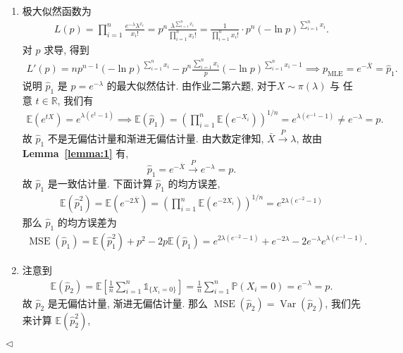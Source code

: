 \documentclass[11pt]{article}
\newenvironment{answer}[1][Solution]{\begin{trivlist}
    \item[\hskip \labelsep {\bfseries #1.}\hskip \labelsep]}{\hfill$\lhd$\end{trivlist}}
\newcommand\1{\mathds{1}}
\newcommand\R{\mathbb{R}}
\newcommand\E{\mathbb{E}}
\newcommand\PP{\mathbb{P}}
\newcommand{\arrp}{\xrightarrow{P}}
\DeclareMathOperator{\Var}{Var}
\DeclareMathOperator{\MSE}{MSE}
\begin{document}
\begin{answer}
    \begin{enumerate}[label=(\arabic*)]
        \item 极大似然函数为
        \begin{align*}
            L(p) = \prod_{i=1}^{n} \frac{e^{-\lambda}\lambda^{x_i}}{x_i!} = p^n \frac{\lambda^{\sum_{i=1}^{n}x_i}}{\prod_{i=1}^{n}x_i!} = \frac{1}{\prod_{i=1}^{n}x_i !}\cdot p^n (-\ln p)^{\sum_{i=1}^{n}x_i}.
        \end{align*}
        对 $p$ 求导, 得到
        \begin{align*}
            L'(p) = n p^{n-1}(-\ln p)^{\sum_{i=1}^{n}x_i} - p^n \frac{\sum_{i=1}^{n}x_i}{p}(-\ln p)^{\sum_{i=1}^{n}x_i - 1} \implies p_{\mathrm{MLE}} = e^{-\bar{X}} = \hat{p}_1.
        \end{align*}
        说明 $\hat{p}_1$ 是 $p = e^{-\lambda}$ 的最大似然估计. 由作业二第六题, 对于$X\sim \pi(\lambda)$ 与 任意 $t\in \R$, 我们有
        \begin{align*}
            \E\left(e^{tX}\right) = e^{\lambda(e^t - 1)} \implies \E\left(\hat{p}_1\right) =  \left(\prod_{i=1}^{n}\E\left(e^{-X_i}\right)\right)^{1/n} = e^{\lambda(e^{-1} - 1)} \neq e^{-\lambda} = p.
        \end{align*}
        故 $\hat{p}_1$ 不是无偏估计量和渐进无偏估计量. 由大数定律知, $\bar{X} \arrp \lambda$, 故由\textbf{Lemma~\ref{lemma:1}} 有, 
        \[
        \hat{p}_1 = e^{-\bar{X}} \arrp e^{-\lambda} = p.
        \] 
        故 $\hat{p}_1$ 是一致估计量. 下面计算 $\hat{p}_1$ 的均方误差,
        \begin{align*}
            \E\left(\hat{p}_1^2\right) = \E\left(e^{-2\bar{X}}\right) =  \left(\prod_{i=1}^{n}\E\left(e^{-2X_i}\right)\right)^{1/n} = e^{2\lambda(e^{-2} - 1)} 
        \end{align*}
        那么 $\hat{p}_1$ 的均方误差为
        \begin{align*}
            \MSE(\hat{p}_1) = \E\left(\hat{p}_1^2\right) + p^2 - 2p\E(\hat{p}_1) = e^{2\lambda(e^{-2} - 1)} + e^{-2\lambda} - 2e^{-\lambda}e^{\lambda(e^{-1} - 1)}.
        \end{align*}
        \item 注意到
        \begin{align*}
            \E\left(\hat{p}_2\right) = \E\left[\frac{1}{n}\sum_{i=1}^{n} \1_{\{X_i = 0\}}\right] = \frac{1}{n} \sum_{i=1}^{n} \PP(X_i = 0) = e^{-\lambda} = p.
        \end{align*}
        故 $\hat{p}_2$ 是无偏估计量, 渐进无偏估计量. 那么 $\MSE(\hat{p}_2) = \Var(\hat{p}_2)$, 我们先来计算 $\E\left(\hat{p}_2^2\right)$,

\end{enumerate}
\end{answer}
\end{document}
